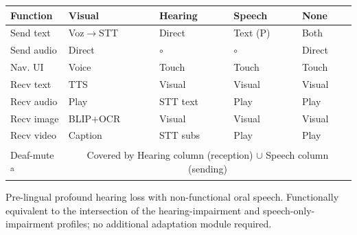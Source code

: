 \documentclass[journal]{IEEEtran}
\begin{document}
	\begin{threeparttable}
		\caption{Functional Coverage Matrix by Sensory Profile.
			\checkmark\,=\,fully supported;
			P\,=\,primary channel for this profile;
			$\circ$\,=\,not applicable (requires impaired capability);
			$\times$\,=\,outside system scope.}
		\label{tab:coverage}
		\centering
		\scriptsize
		\renewcommand{\arraystretch}{1.25}
		\begin{tabular}{p{1.5cm}p{1.3cm}p{1.3cm}p{1.7cm}p{1.0cm}}
			\toprule
			\textbf{Function} & \textbf{Visual} & \textbf{Hearing} & \textbf{Speech} & \textbf{None} \\
			\midrule
			Send text & Voz$\to$STT\,\checkmark & Direct\,\checkmark & Text (P)\,\checkmark & Both\,\checkmark \\
			Send audio & Direct\,\checkmark & $\circ$ & $\circ$ & Direct\,\checkmark \\
			Nav. UI & Voice\,\checkmark & Touch\,\checkmark & Touch\,\checkmark & Touch\,\checkmark \\
			Recv text & TTS\,\checkmark & Visual\,\checkmark & Visual\,\checkmark & Visual\,\checkmark \\
			Recv audio & Play\,\checkmark & STT text\,\checkmark & Play\,\checkmark & Play\,\checkmark \\
			Recv image & BLIP+OCR\,\checkmark & Visual\,\checkmark & Visual\,\checkmark & Visual\,\checkmark \\
			Recv video & Caption\,\checkmark & STT subs\,\checkmark & Play\,\checkmark & Play\,\checkmark \\
			Deaf-mute\textsuperscript{\,a} & \multicolumn{4}{c}{Covered by Hearing column (reception) $\cup$ Speech column (sending)} \\
			\bottomrule
		\end{tabular}
		\begin{tablenotes}
			\scriptsize
			\item[a] Pre-lingual profound hearing loss with non-functional oral
			speech. Functionally equivalent to the intersection of the
			hearing-impairment and speech-only-impairment profiles; no additional
			adaptation module required.
		\end{tablenotes}
	\end{threeparttable}
	
\end{document}
